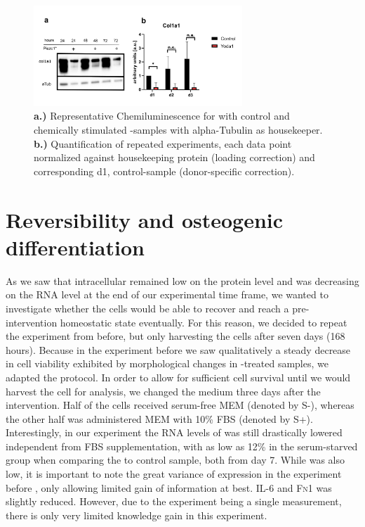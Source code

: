 \begin{figure}[htbp]
\centering
\includegraphics[width = 0.7\textwidth]{NormalYodaExp_WesternBlot_Col1a1.png}
\caption{
\textbf{a.)} Representative Chemiluminescence for \colone with control and chemically stimulated \Piezo{}-samples with alpha-Tubulin as housekeeper.
\textbf{b.)} Quantification of repeated experiments, each data point normalized against housekeeping protein (loading correction) and corresponding d1, control-sample (donor-specific correction).}
\label{fig:Yoda_Norm_WB}
\end{figure}

\section{Reversibility and osteogenic differentiation}
As we saw that intracellular \colone{} remained low on the protein level and was decreasing on the RNA level at the end of our experimental time frame, we wanted to investigate whether the cells would be able to recover and reach a pre-intervention homeostatic state eventually. For this reason, we decided to repeat the experiment from before, but only harvesting the cells after seven days (168 hours). Because in the experiment before we saw qualitatively a steady decrease in cell viability exhibited by morphological changes in \Yoda{}-treated samples, we adapted the protocol. In order to allow for sufficient cell survival  until we would harvest the cell for analysis, we changed the medium three days after the intervention. Half of the cells received serum-free MEM\textalpha{} (denoted by S-), whereas the other half was administered MEM\textalpha{} with 10\% FBS (denoted by S+).\\
Interestingly, in our experiment the RNA levels of \colone{} was still drastically lowered independent from FBS supplementation, with as low as 12\% in the serum-starved group  when comparing the \Yoda{} to control sample, both from day 7. While \colthree{} was also low, it is important to note the great variance of \colthree{} expression in the experiment before , only allowing limited gain of information at best. IL-6 and \textsc{Fn}1 was slightly reduced. However, due to the experiment being a single measurement, there is only very limited knowledge gain in this experiment. 

